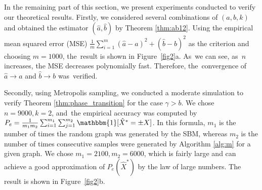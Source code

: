 \documentclass[entropy,article,accept,moreauthors,pdftex]{Definitions/mdpi}
\newcommand{\1}{\mathbbm{1}}
\begin{document}
\begin{paracol}{2}
In the remaining part of this section, we present  experiments conducted to verify our theoretical results.
Firstly, we considered several combinations of $(a,b,k)$ and obtained the estimator $(\hat{a}, \hat{b})$ by Theorem \ref{thm:ab12}. Using
the empirical mean squared error (MSE) $\frac{1}{m} \sum_{i=1}^m (\hat{a}-a)^2 + (\hat{b}-b)^2$ as the criterion
and choosing $m=1000$, the~result is shown in Figure~\ref{fig2}a. As~we can see, as~$n$ increases, the MSE decreases polynomially fast. Therefore, the~convergence
of $\hat{a} \to a$ and $\hat{b} \to b$ was~verified.

Secondly, using Metropolis sampling, we conducted a moderate simulation to verify Theorem \ref{thm:phase_transition} for the case $\gamma > b$.
We chose $n=9000, k=2$, and~the empirical accuracy was computed by $P_e = \frac{1}{m_1m_2}\sum_{i=1}^{m_1} \sum_{j=1}^{m_2} \mathbbm{1}[\hat{X}^* = \pm X]$.
In this formula, $m_1$ is the number of times   the random graph was generated by the SBM,
whereas $m_2$ is the number of times  consecutive samples were generated by Algorithm \ref{alg:m} for a given graph.
We chose $m_1=2100,m_2=6000$, which is fairly large and can achieve a good approximation of $P_e(\hat{X}^*)$ by the law of large numbers.
The result is shown in Figure~\ref{fig2}b.
\end{paracol}
\nointerlineskip
\end{document}

